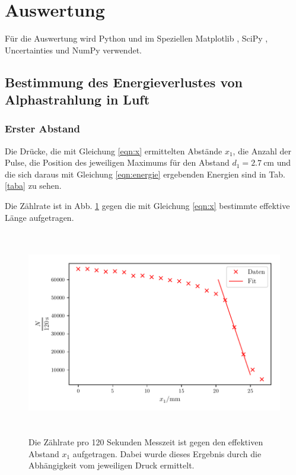 \section{Auswertung}
\label{sec:Auswertung}

Für die Auswertung wird Python und im Speziellen Matplotlib \cite{matplotlib}, SciPy \cite{scipy}, Uncertainties \cite{uncertainties} und NumPy \cite{numpy} verwendet.

\subsection{Bestimmung des Energieverlustes von Alphastrahlung in Luft}

\subsubsection{Erster Abstand}
Die Drücke, die mit Gleichung \eqref{eqn:x} ermittelten Abstände $x_1$, die Anzahl der Pulse, die Position des jeweiligen Maximums für den Abstand $d_1 = \SI{2.7}{\centi\meter}$ und die sich daraus mit Gleichung \eqref{eqn:energie} ergebenden Energien sind in Tab. \ref{taba} zu sehen.
 


\noindent Die Zählrate ist in Abb. \ref{zaehlrate1} gegen die mit Gleichung \eqref{eqn:x} bestimmte effektive Länge aufgetragen.

\begin{figure}
    \centering
    \includegraphics[width=15cm, height=9cm]{build/plota.pdf}
    \caption{Die Zählrate pro 120 Sekunden Messzeit ist gegen den effektiven Abstand $x_1$ aufgetragen. Dabei wurde dieses Ergebnis durch die Abhängigkeit vom jeweiligen Druck ermittelt.}
    \label{zaehlrate1}
\end{figure}

